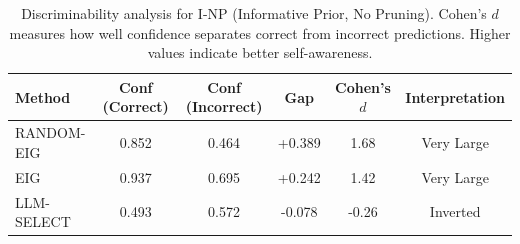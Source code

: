\begin{table}[htbp]
\centering
\small
\caption{Discriminability analysis for I-NP (Informative Prior, No Pruning). Cohen's $d$ measures how well confidence separates correct from incorrect predictions. Higher values indicate better self-awareness.}
\label{tab:discriminability-notprune_notuniform}
\begin{tabular}{@{}lccccc@{}}
\toprule
Method & Conf (Correct) & Conf (Incorrect) & Gap & Cohen's $d$ & Interpretation \\
\midrule
RANDOM-EIG & 0.852 & 0.464 & +0.389 & 1.68 & Very Large \\
EIG & 0.937 & 0.695 & +0.242 & 1.42 & Very Large \\
LLM-SELECT & 0.493 & 0.572 & -0.078 & -0.26 & Inverted \\
\bottomrule
\end{tabular}
\end{table}